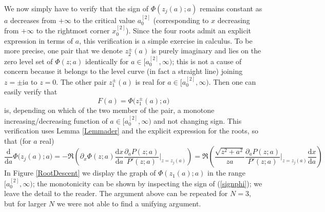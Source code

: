 \documentclass[10pt,reqno,oneside]{amsart}
\renewcommand{\d}{{\mathrm d}}
\newcommand{\im}{\mathrm{i}}
\numberwithin{equation}{section}
\def\be{\begin{equation}}
\def\ee{\end{equation}}
\def \pa{\partial}
\def\eqref#1{(\ref{#1})}
\begin{document}
We now simply have to verify that the sign of $\Phi (z_j(a);a)$ remains constant as $a$ decreases from $+\infty$ to the critical value $a_{0}^{[2]}$ (corresponding to $x$ decreasing from $+\infty$ to the rightmost corner $x_{0}^{[2]}$). Since the four roots admit an explicit expression in terms of $a$, this verification is a simple exercise  in calculus. To be more precise, one pair that we denote $z_2^\pm(a)$ is purely imaginary and   lies on the zero level set of $\Phi(z;a)$ identically for $a\in [a_{0}^{[2]}, \infty )$; this is not a cause of concern because it belongs to the level curve (in fact a straight line) joining $z=\pm\im a$ to $z=0$. 
The other pair $z_1^\pm(a)$ is real for $a\in [a_{0}^{[2]}, \infty )$. Then one can easily verify that 
\begin{equation*}
F(a)= \Phi\big(z_1^\pm (a);a\big)
\end{equation*}
is, depending on which of the two member of the pair,  a monotone increasing/decreasing function of $a\in [a_{0}^{[2]}, \infty ) $ and not changing sign. This verification uses Lemma \ref{Lemmader} and the explicit expression for the roots, so that (for $a$ real) 
\be
\label{signphi}
\frac {\d}{\d a} \Phi\big(z_j(a);a\big)  =  - \Re \left({\pa_x}\Phi(z;a) \frac {\d x}{\d a} \frac {\pa_a P(z;a)}{P'(z;a)} \bigg|_{z=z_j(a)}\right)
= 
\Re\left(\frac {\sqrt{z^2 + a^2}}{za}  \frac {\pa_a P(z;a)}{P'(z;a)} \bigg|_{z=z_j(a)}\frac {\d x}{\d a}\right)
\ee
In Figure \ref{RootDescent} we display the graph of $\Phi(z_1(a);a)$ in the range $[a_{0}^{[2]},\infty)$; the monotonicity can be shown by inspecting the sign of \eqref{signphi}; we leave the detail to the reader.
The argument above can be repeated for $N=3$, but for larger $N$ we were not able to find a unifying argument. 
\vspace{-1.2cm}
\end{document}
